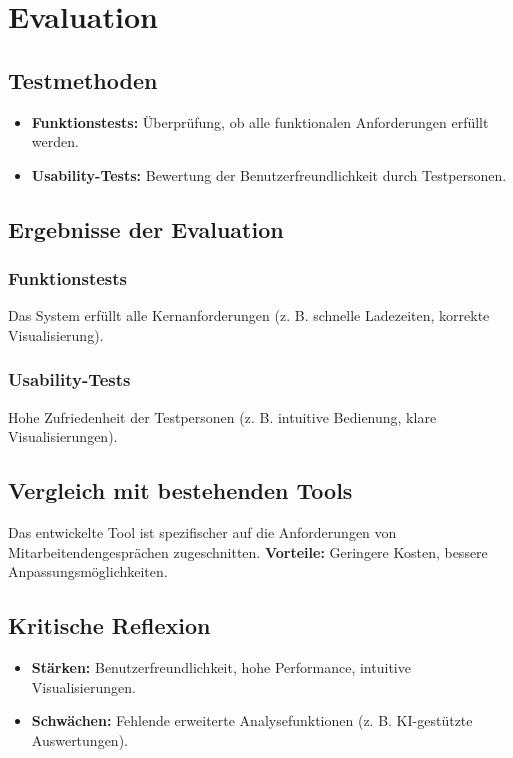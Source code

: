 \chapter{Evaluation}
\label{chap:evaluation}

\section{Testmethoden}
\begin{itemize}
    \item \textbf{Funktionstests:} Überprüfung, ob alle funktionalen Anforderungen erfüllt werden.
    \item \textbf{Usability-Tests:} Bewertung der Benutzerfreundlichkeit durch Testpersonen.
\end{itemize}

\section{Ergebnisse der Evaluation}
\subsection{Funktionstests}
Das System erfüllt alle Kernanforderungen (z. B. schnelle Ladezeiten, korrekte Visualisierung).

\subsection{Usability-Tests}
Hohe Zufriedenheit der Testpersonen (z. B. intuitive Bedienung, klare Visualisierungen).

\section{Vergleich mit bestehenden Tools}
Das entwickelte Tool ist spezifischer auf die Anforderungen von Mitarbeitendengesprächen zugeschnitten.  
\textbf{Vorteile:} Geringere Kosten, bessere Anpassungsmöglichkeiten.

\section{Kritische Reflexion}
\begin{itemize}
    \item \textbf{Stärken:} Benutzerfreundlichkeit, hohe Performance, intuitive Visualisierungen.
    \item \textbf{Schwächen:} Fehlende erweiterte Analysefunktionen (z. B. KI-gestützte Auswertungen).
\end{itemize}